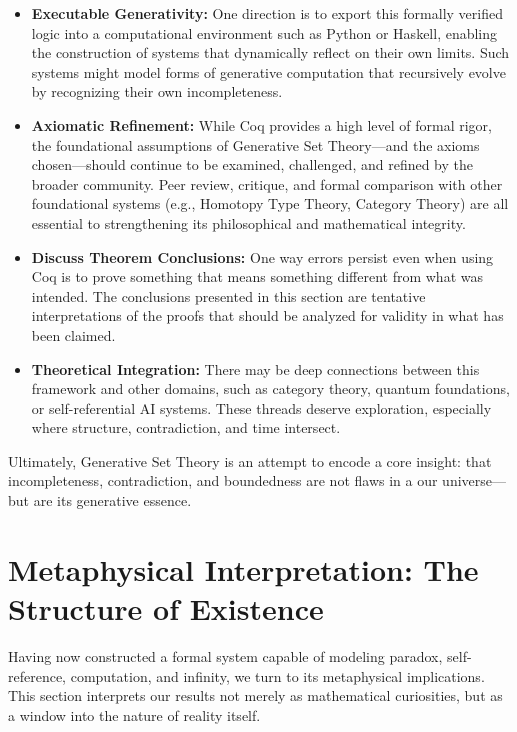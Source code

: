\documentclass[12pt]{article}
\begin{document}
\begin{itemize}
    \item \textbf{Executable Generativity:} One direction is to export this formally verified logic into a computational environment such as Python or Haskell, enabling the construction of systems that dynamically reflect on their own limits. Such systems might model forms of generative computation that recursively evolve by recognizing their own incompleteness.

    \item \textbf{Axiomatic Refinement:} While Coq provides a high level of formal rigor, the foundational assumptions of Generative Set Theory—and the axioms chosen—should continue to be examined, challenged, and refined by the broader community. Peer review, critique, and formal comparison with other foundational systems (e.g., Homotopy Type Theory, Category Theory) are all essential to strengthening its philosophical and mathematical integrity.

    \item \textbf{Discuss Theorem Conclusions:} One way errors persist even when using Coq is to prove something that means something different from what was intended. The conclusions presented in this section are tentative interpretations of the proofs that should be analyzed for validity in what has been claimed.

    \item \textbf{Theoretical Integration:} There may be deep connections between this framework and other domains, such as category theory, quantum foundations, or self-referential AI systems. These threads deserve exploration, especially where structure, contradiction, and time intersect.
\end{itemize}

Ultimately, Generative Set Theory is an attempt to encode a core insight: that incompleteness, contradiction, and boundedness are not flaws in a our universe—but are its generative essence.


\section{Metaphysical Interpretation: The Structure of Existence}

Having now constructed a formal system capable of modeling paradox, self-reference, computation, and infinity, we turn to its metaphysical implications. This section interprets our results not merely as mathematical curiosities, but as a window into the nature of reality itself.
\end{document}
